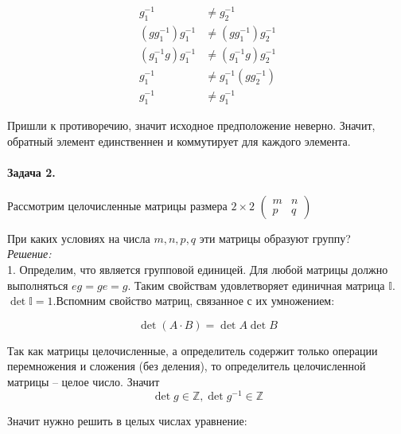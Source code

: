 \documentclass[10pt,a4paper]{article}
\begin{document}
	\begin{align}
		\label{eq:ex_1_eq_12}
		g_{1}^{-1} &\neq g_{2}^{-1}	\\
		\label{eq:ex_1_eq_13}
		\left(gg_{1}^{-1}\right)g_{1}^{-1} &\neq \left(gg_{1}^{-1}\right)
		g_{2}^{-1}	\\
		\label{eq:ex_1_eq_14}
		\left(g_{1}^{-1}g\right)g_{1}^{-1} &\neq \left(g_{1}^{-1}g\right)
		g_{2}^{-1}	\\	
		\label{eq:ex_1_eq_15}
		g_{1}^{-1} &\neq g_{1}^{-1}\left(gg_{2}^{-1}\right) \\
		\label{eq:ex_1_eq_16}
		g_{1}^{-1} &\neq g_{1}^{-1}
	\end{align}
	
	Пришли к противоречию, значит исходное предположение неверно. Значит, 
	обратный элемент единственнен и коммутирует для каждого элемента.
	
	\paragraph{Задача 2.} Рассмотрим целочисленные матрицы размера $2\times 2$
	$\begin{pmatrix}
		m & n \\
		p & q
	\end{pmatrix}$
	
	При каких условиях на числа $m, n, p, q$ эти матрицы образуют группу?\\
	
	\textit{Решение:}\\
	
	1. Определим, что является групповой единицей. Для любой матрицы должно 
	выполняться $eg = ge =g$. Таким свойствам удовлетворяет единичная матрица 
	$\mathbb{I}$. $\det \mathbb{I} = 1$.Вспомним свойство матриц, связанное с их
	 умножением:
	
	\begin{equation}
		\label{eq:ex_2_eq_01}
		\det\left(A\cdot B\right) = \det A \det B
	\end{equation}
	
	Так как матрицы целочисленные, а определитель содержит только операции 
	перемножения и сложения (без деления), то определитель целочисленной матрицы
	-- целое число. Значит
	\begin{equation}
		\label{eq:ex_2_eq_02}
		\det g \in \mathbb{Z}, \det g^{-1} \in \mathbb{Z} 
	\end{equation}
	
	Значит нужно решить в целых числах уравнение:
	
\end{document}
